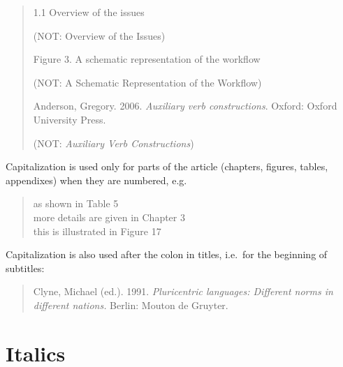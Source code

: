 \documentclass[a4paper]{article}
\newenvironment{gsrexq}{\begin{quote}\color{blue}}{\end{quote}}
\begin{document}
\begin{gsrexq}
1.1 Overview of the issues 

\qquad (NOT: Overview of the Issues) 

\noindent 
Figure 3. A schematic representation of the workflow 

\qquad (NOT: A Schematic Representation of the Workflow) 

\noindent
Anderson, Gregory. 2006. \textit{Auxiliary verb constructions}. Oxford: Oxford University Press.

\qquad (NOT: \textit{Auxiliary Verb Constructions})
\end{gsrexq}


Capitalization is used only for parts of the article (chapters, figures,
tables, appendixes) when they are numbered, e.g.

\begin{gsrexq}
  as shown in Table 5\\
  more details are given in Chapter 3\\
  this is illustrated in Figure 17\\
\end{gsrexq}


Capitalization is also used after the colon in titles, i.e.~for the
beginning of subtitles: 

\begin{gsrexq} 
  Clyne, Michael (ed.). 1991. \textit{Pluricentric languages: Different norms in different nations.} Berlin: Mouton de Gruyter.
\end{gsrexq}


\section{Italics}\label{sec:italics}
\end{document}
